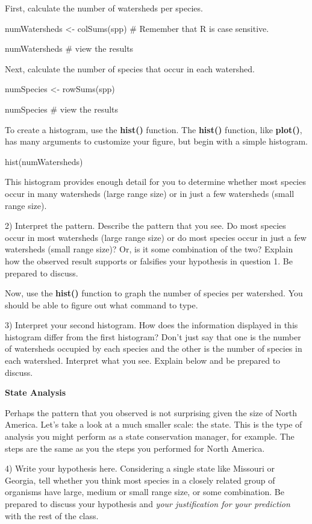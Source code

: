 First, calculate the number of watersheds per species.

numWatersheds \textless{}- colSums(spp) \# Remember that R is case
sensitive.

numWatersheds \# view the results

Next, calculate the number of species that occur in each watershed.

numSpecies \textless{}- rowSums(spp)

numSpecies \# view the results

To create a histogram, use the \textbf{hist()} function. The
\textbf{hist()} function, like \textbf{plot()}, has many arguments to
customize your figure, but begin with a simple histogram.

hist(numWatersheds)

This histogram provides enough detail for you to determine whether most
species occur in many watersheds (large range size) or in just a few
watersheds (small range size).

2) Interpret the pattern. Describe the pattern that you see. Do most
species occur in most watersheds (large range size) or do most species
occur in just a few watersheds (small range size)? Or, is it some
combination of the two? Explain how the observed result supports or
falsifies your hypothesis in question 1. Be prepared to discuss.

Now, use the \textbf{hist()} function to graph the number of species per
watershed. You should be able to figure out what command to type.

3) Interpret your second histogram. How does the information displayed
in this histogram differ from the first histogram? Don't just say that
one is the number of watersheds occupied by each species and the other
is the number of species in each watershed. Interpret what you see.
Explain below and be prepared to discuss.

\textbf{State Analysis}

Perhaps the pattern that you observed is not surprising given the size
of North America. Let's take a look at a much smaller scale: the state.
This is the type of analysis you might perform as a state conservation
manager, for example. The steps are the same as you the steps you
performed for North America.

4) Write your hypothesis here. Considering a single state like Missouri
or Georgia, tell whether you think most species in a closely related
group of organisms have large, medium or small range size, or some
combination. Be prepared to discuss your hypothesis and \emph{your
justification for your prediction} with the rest of the class.

